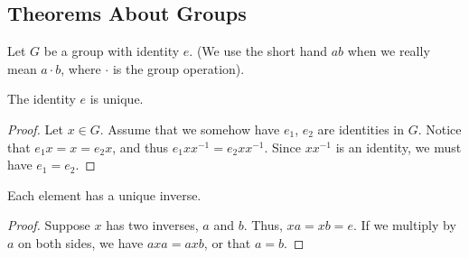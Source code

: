 
% 





% 




\subsection{Theorems About Groups}
 
Let $G$ be a group with identity $e$. (We use the short hand $ab$ when we really mean $a \cdot b$, where $\cdot$ is the group operation). 

\begin{theorem}
The identity $e$ is unique.
\end{theorem}
\begin{proof}
Let $x \in G$. Assume that we somehow have $e_1$, $e_2$ are identities in $G$. Notice that $e_1 x = x = e_2 x$, and thus $e_1 x x^{-1} = e_2 x x^{-1}$. Since $x x^{-1}$ is an identity, we must have $e_1 = e_2$. 
\end{proof}

\begin{theorem}
Each element has a unique inverse. 
\end{theorem}
\begin{proof}
Suppose $x$ has two inverses, $a$ and $b$. Thus, $xa = xb = e$. If we multiply by $a$ on both sides, we have $axa = axb$, or that $a = b$. 
\end{proof}


